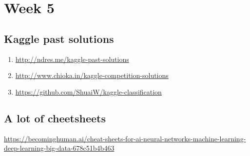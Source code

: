 \documentclass[11pt, twoside]{article}   	%
\begin{document}
\pagebreak
\section{Week 5}
\subsection{Kaggle past solutions}
\begin{enumerate}
    \item \url{http://ndres.me/kaggle-past-solutions}
    \item \url{http://www.chioka.in/kaggle-competition-solutions}
    \item \url{https://github.com/ShuaiW/kaggle-classification}
 \end{enumerate}    

\subsection{A lot of cheetsheets}
\url{https://becominghuman.ai/cheat-sheets-for-ai-neural-networks-machine-learning-deep-learning-big-data-678c51b4b463}
\end{document}
